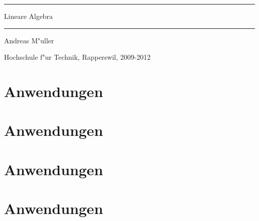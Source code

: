 \documentclass[a4paper,12pt]{book}
\begin{document}
\pagestyle{fancy}
\frontmatter
\newcommand\HRule{\noindent\rule{\linewidth}{1.5pt}}
\begin{titlepage}
\HRule
\vspace*{10pt}
\begin{flushright}
{\Huge
Lineare Algebra}
\end{flushright}
\HRule
\begin{flushright}
\vspace{30pt}
\LARGE
Andreas M"uller
\end{flushright}
\begin{center}
Hochschule f"ur Technik, Rapperswil, 2009-2012
\end{center}
\end{titlepage}

\tableofcontents
\newtheorem{satz}{Satz}[chapter]
\newtheorem{hilfssatz}[satz]{Hilfssatz}
\newtheorem{definition}[satz]{Definition}
\newtheorem{annahme}[satz]{Annahme}
\newenvironment{beispiel}[1][Beispiel]{%
\begin{proof}[\bf #1]%
\renewcommand{\qedsymbol}{$\bigcirc$}%
}{\end{proof}}
\mainmatter



\section{Anwendungen}



\section{Anwendungen}



\section{Anwendungen}




%
%
%
%

\section{Anwendungen}


\appendix
\end{document}
